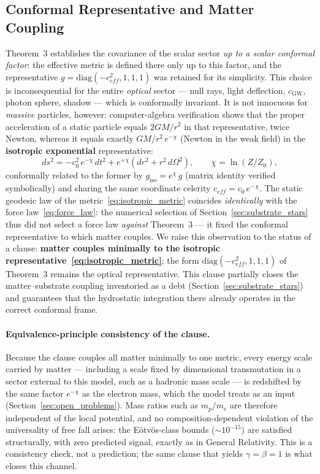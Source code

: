 \documentclass[11pt,a4paper]{article}
\theoremstyle{plain}
\theoremstyle{remark}
\begin{document}
\subsection{Conformal Representative and Matter Coupling}
\label{sec:conformal_representative}
Theorem~3 establishes the covariance of the scalar sector \emph{up to a scalar conformal factor}: the effective metric is defined there only up to this factor, and the representative $g = \mathrm{diag}(-c_{eff}^2, 1, 1, 1)$ was retained for its simplicity. This choice is inconsequential for the entire \emph{optical} sector --- null rays, light deflection, $c_{\text{GW}}$, photon sphere, shadow --- which is conformally invariant. It is not innocuous for \emph{massive} particles, however: computer-algebra verification shows that the proper acceleration of a static particle equals $2GM/r^2$ in that representative, twice Newton, whereas it equals exactly $GM/r^2\,e^{-\chi}$ (Newton in the weak field) in the \textbf{isotropic exponential} representative:
\begin{equation}\label{eq:isotropic_metric}
ds^2 = -c_0^2\,e^{-\chi}\,dt^2 + e^{+\chi}\left(dr^2 + r^2\,d\Omega^2\right), \qquad \chi = \ln(Z/Z_0),
\end{equation}
conformally related to the former by $g_{\text{iso}} = e^{\chi}\,g$ (matrix identity verified symbolically) and sharing the same coordinate celerity $c_{eff} = c_0\,e^{-\chi}$. The static geodesic law of the metric~\eqref{eq:isotropic_metric} coincides \emph{identically} with the force law~\eqref{eq:force_law}: the numerical selection of Section~\ref{sec:substrate_stars} thus did not select a force law \emph{against} Theorem~3 --- it fixed the conformal representative to which matter couples. We raise this observation to the status of a clause: \textbf{matter couples minimally to the isotropic representative~\eqref{eq:isotropic_metric}}; the form $\mathrm{diag}(-c_{eff}^2,1,1,1)$ of Theorem~3 remains the optical representative. This clause partially closes the matter--substrate coupling inventoried as a debt (Section~\ref{sec:substrate_stars}) and guarantees that the hydrostatic integration there already operates in the correct conformal frame.

\paragraph{Equivalence-principle consistency of the clause.} Because the clause couples all matter minimally to one metric, every energy scale carried by matter --- including a scale fixed by dimensional transmutation in a sector external to this model, such as a hadronic mass scale --- is redshifted by the same factor $e^{-\chi}$ as the electron mass, which the model treats as an input (Section~\ref{sec:open_problems}). Mass ratios such as $m_p/m_e$ are therefore independent of the local potential, and no composition-dependent violation of the universality of free fall arises: the Eötvös-class bounds ($\sim10^{-15}$) are satisfied structurally, with zero predicted signal, exactly as in General Relativity. This is a consistency check, not a prediction; the same clause that yields $\gamma = \beta = 1$ is what closes this channel.
\end{document}
